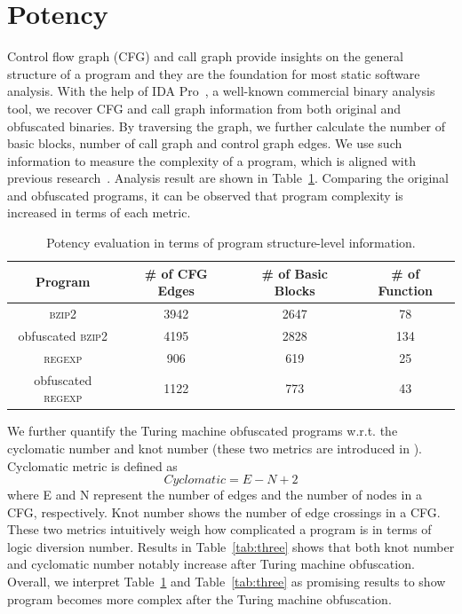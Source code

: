 \section{Potency}
Control flow graph (CFG) and call graph provide insights on the general
structure of a program and they are the foundation for most static software
analysis. With the help of IDA Pro~\cite{ida}, a well-known commercial binary
analysis tool, we recover CFG and call graph information from both original and
obfuscated binaries. By traversing the graph, we further calculate the number of
basic blocks, number of call graph and control graph edges. We use such
information to measure the complexity of a program, which is aligned with
previous research~\cite{Chen}. Analysis result are shown in Table~\ref{tab:two}.
Comparing the original and obfuscated programs, it can be observed that program
complexity is increased in terms of each metric.

\begin{table}
  \centering
 \caption{Potency evaluation in terms of program structure-level information.}
 \label{tab:two}
 \begin{tabular}{|c|c|c|c|}
 \hline 
 \textbf{Program} & \textbf{\# of CFG Edges} & \textbf{\# of Basic Blocks} & \textbf{\# of Function} \\
 \hline
\textsc{bzip2} & 3942 & 2647 & 78 \\ 
 \hline
obfuscated \textsc{bzip2} & 4195 & 2828 & 134 \\
 \hline
\textsc{regexp} & 906 & 619 & 25 \\ 
 \hline
obfuscated \textsc{regexp} & 1122 & 773 & 43 \\
 \hline
\end{tabular}
\end{table}

We further quantify the Turing machine obfuscated programs w.r.t. the cyclomatic
number and knot number (these two metrics are introduced in
\cite{McCabe,Woodward}). Cyclomatic metric is defined as \[ Cyclomatic = E - N +
2 \] where E and N represent the number of edges and the number of nodes in a
CFG, respectively. Knot number shows the number of edge crossings in a CFG.
These two metrics intuitively weigh how complicated a program is in terms of
logic diversion number. Results in Table~\ref{tab:three} shows that both knot
number and cyclomatic number notably increase after Turing machine obfuscation.
Overall, we interpret Table~\ref{tab:two} and Table~\ref{tab:three} as promising
results to show program becomes more complex after the Turing machine
obfuscation.

